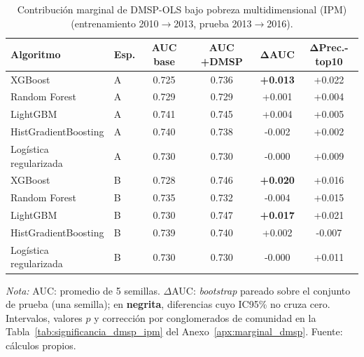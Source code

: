 \begin{table}[H]
  \centering
  \caption{Contribución marginal de DMSP-OLS bajo pobreza
  multidimensional (IPM) (entrenamiento 2010$\to$2013, prueba
  2013$\to$2016).}
  \label{tab:marginal_dmsp_ipm_significancia}
  \footnotesize
  \setlength{\tabcolsep}{6pt}
  \begin{tabular}{llcccc}
    \toprule
    \textbf{Algoritmo} & \textbf{Esp.} & \textbf{AUC base} & \textbf{AUC +DMSP} & $\boldsymbol{\Delta}$\textbf{AUC} & $\boldsymbol{\Delta}$\textbf{Prec.-top10} \\
    \midrule
    XGBoost                  & A & 0.725 & 0.736 & \textbf{+0.013} & +0.022 \\
    Random Forest            & A & 0.729 & 0.729 & +0.001 & +0.004 \\
    LightGBM                 & A & 0.741 & 0.745 & +0.004 & +0.005 \\
    HistGradientBoosting     & A & 0.740 & 0.738 & -0.002 & +0.002 \\
    Logística regularizada   & A & 0.730 & 0.730 & -0.000 & +0.009 \\
    \addlinespace
    XGBoost                  & B & 0.728 & 0.746 & \textbf{+0.020} & +0.016 \\
    Random Forest            & B & 0.735 & 0.732 & -0.004 & +0.015 \\
    LightGBM                 & B & 0.730 & 0.747 & \textbf{+0.017} & +0.021 \\
    HistGradientBoosting     & B & 0.739 & 0.740 & +0.002 & -0.007 \\
    Logística regularizada   & B & 0.730 & 0.730 & -0.000 & +0.011 \\
    \bottomrule
  \end{tabular}
  \begin{minipage}{0.95\textwidth}
    \vspace{4pt}
    \footnotesize \textit{Nota:} AUC: promedio de 5 semillas.
    $\Delta$AUC: \emph{bootstrap} pareado sobre el conjunto de prueba
    (una semilla); en \textbf{negrita}, diferencias cuyo IC95\% no
    cruza cero. Intervalos, valores $p$ y corrección por
    conglomerados de comunidad en la
    Tabla~\ref{tab:significancia_dmsp_ipm} del
    Anexo~\ref{apx:marginal_dmsp}. Fuente: cálculos propios.
  \end{minipage}
\end{table}